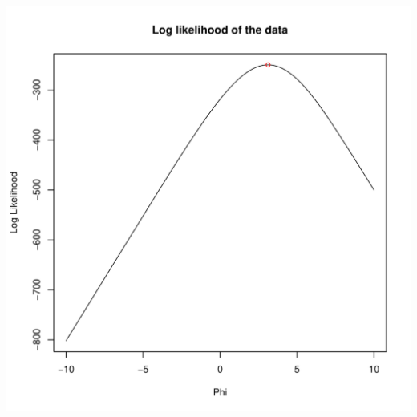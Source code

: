\documentclass[11pt]{article}\usepackage[]{graphicx}\usepackage[]{color}
\makeatletter
\def\maxwidth{ %
  \ifdim\Gin@nat@width>\linewidth
    \linewidth
  \else
    \Gin@nat@width
  \fi
}
\newenvironment{knitrout}{}{} %
\makeatother
\begin{document}
\begin{knitrout}
\includegraphics[width=\maxwidth]{figure/unnamed-chunk-4-1} 

\end{knitrout}
\end{document}
